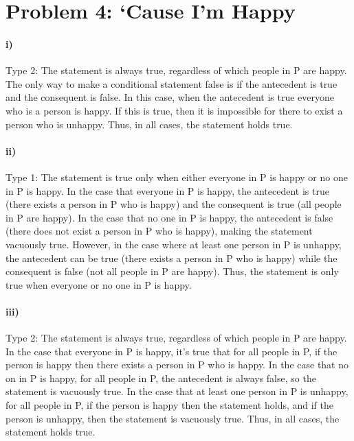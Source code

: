 \documentclass[10pt,letter]{article}
\begin{document}
\section*{Problem 4: `Cause I'm Happy}

\paragraph{i)} Type 2: The statement is always true, regardless of which people in P are happy. The only way to make a conditional statement false is if the antecedent is true and the consequent is false. In this case, when the antecedent is true everyone who is a person is happy. If this is true, then it is impossible for there to exist a person who is unhappy. Thus, in all cases, the statement holds true.

\paragraph{ii)} Type 1: The statement is true only when either everyone in P is happy or no one in P is happy. In the case that everyone in P is happy, the antecedent is true (there exists a person in P who is happy) and the consequent is true (all people in P are happy). In the case that no one in P is happy, the antecedent is false (there does not exist a person in P who is happy), making the statement vacuously true. However, in the case where at least one person in P is unhappy, the antecedent can be true (there exists a person in P who is happy) while the consequent is false (not all people in P are happy). Thus, the statement is only true when everyone or no one in P is happy. 

\paragraph{iii)} Type 2: The statement is always true, regardless of which people in P are happy. In the case that everyone in P is happy, it's true that for all people in P, if the person is happy then there exists a person in P who is happy. In the case that no on in P is happy, for all people in P, the antecedent is always false, so the statement is vacuously true. In the case that at least one person in P is unhappy, for all people in P, if the person is happy then the statement holds, and if the person is unhappy, then the statement is vacuously true. Thus, in all cases, the statement holds true.
\end{document}

